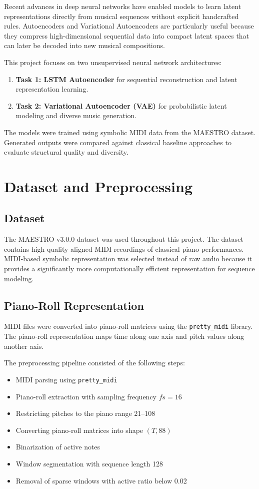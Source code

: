\documentclass[conference]{IEEEtran}
\begin{document}
Recent advances in deep neural networks have enabled models to learn latent representations directly from musical sequences without explicit handcrafted rules. Autoencoders and Variational Autoencoders are particularly useful because they compress high-dimensional sequential data into compact latent spaces that can later be decoded into new musical compositions.

This project focuses on two unsupervised neural network architectures:

\begin{enumerate}
    \item \textbf{Task 1: LSTM Autoencoder} for sequential reconstruction and latent representation learning.
    \item \textbf{Task 2: Variational Autoencoder (VAE)} for probabilistic latent modeling and diverse music generation.
\end{enumerate}

The models were trained using symbolic MIDI data from the MAESTRO dataset. Generated outputs were compared against classical baseline approaches to evaluate structural quality and diversity.

\section{Dataset and Preprocessing}
\subsection{Dataset}
The MAESTRO v3.0.0 dataset was used throughout this project. The dataset contains high-quality aligned MIDI recordings of classical piano performances. MIDI-based symbolic representation was selected instead of raw audio because it provides a significantly more computationally efficient representation for sequence modeling.

\subsection{Piano-Roll Representation}
MIDI files were converted into piano-roll matrices using the \texttt{pretty\_midi} library. The piano-roll representation maps time along one axis and pitch values along another axis.

The preprocessing pipeline consisted of the following steps:

\begin{itemize}
    \item MIDI parsing using \texttt{pretty\_midi}
    \item Piano-roll extraction with sampling frequency $fs = 16$
    \item Restricting pitches to the piano range 21--108
    \item Converting piano-roll matrices into shape $(T, 88)$
    \item Binarization of active notes
    \item Window segmentation with sequence length 128
    \item Removal of sparse windows with active ratio below 0.02
\end{itemize}
\end{document}
